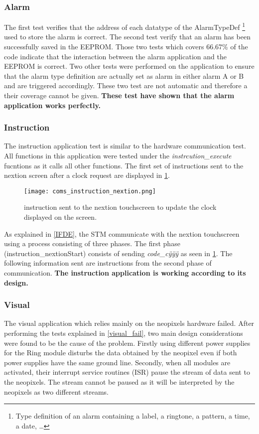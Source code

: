 \subsubsection{Alarm}
The first test verifies that the address of each datatype of the AlarmTypeDef \footnote{Type definition of an alarm containing a label, a ringtone, a pattern, a time, a date, \ldots} used to store the alarm is correct. The second test verify that an alarm has been successfully saved in the EEPROM. Those two tests which covers 66.67\% of the code indicate that the interaction between the alarm application and the EEPROM is correct. Two other tests were performed on the application to ensure that the alarm type definition are actually set as alarm in either alarm A or B and are triggered accordingly. These two test are not automatic and therefore a their coverage cannot be given. \textbf{These test have shown that the alarm application works perfectly.}

\subsubsection{Instruction}
The instruction application test is similar to the hardware communication test. All functions in this application were tested under the \textit{instrcution\_execute} fucntions as it calls all other functions. The first set of instructions sent to the nextion screen after a clock request are displayed in \cref{fig:coms_instruction_nextion}.
\begin{figure}[ht]
	\centering
	\texttt{[image: coms\_instruction\_nextion.png]}
	\caption{instruction sent to the nextion touchscreen to update the clock displayed on the screen.}
	\label{fig:coms_instruction_nextion}
\end{figure}
As explained in \ref{IFDE}, the STM communicate with the nextion touchscreen using a process consisting of three phases. The first phase (instruction\_nextionStart) consists of sending \textit{code\_c\"{y}\"{y}\"{y}} as seen in \cref{fig:coms_instruction_nextion}. The following information sent are instructions from the second phase of communication. \textbf{The instruction application is working according to its design.}

\subsubsection{Visual}
The visual application which relies mainly on the neopixels hardware failed. After performing the tests explained in \ref{visual_fail}, two main design considerations were found to be the cause of the problem. Firstly using different power supplies for the Ring module disturbs the data obtained by the neopixel even if both power supplies have the same ground line. Secondly, when all modules are activated, their interrupt service routines (ISR) pause the stream of data sent to the neopixels. The stream cannot be paused as it will be interpreted by the neopixels as two different streams. 

